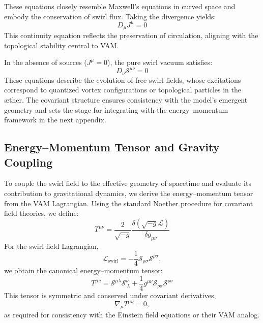         These equations closely resemble Maxwell's equations in curved space and embody the conservation of swirl flux. Taking the divergence yields:
        \begin{equation}
            D_\mu J^\mu = 0
        \end{equation}
        This continuity equation reflects the preservation of circulation, aligning with the topological stability central to VAM.

        In the absence of sources ($J^\mu = 0$), the pure swirl vacuum satisfies:
        \begin{equation}
            D_\nu \mathcal{S}^{\mu\nu} = 0
        \end{equation}
        These equations describe the evolution of free swirl fields, whose excitations correspond to quantized vortex configurations or topological particles in the æther. The covariant structure ensures consistency with the model's emergent geometry and sets the stage for integrating with the energy–momentum framework in the next appendix.

        \subsection{Energy--Momentum Tensor and Gravity Coupling}
        To couple the swirl field to the effective geometry of spacetime and evaluate its contribution to gravitational dynamics, we derive the energy--momentum tensor from the VAM Lagrangian. Using the standard Noether procedure for covariant field theories, we define:
        \begin{equation}
            T^{\mu\nu} = \frac{2}{\sqrt{-g}} \frac{\delta (\sqrt{-g} \mathcal{L})}{\delta g_{\mu\nu}}
        \end{equation}
        For the swirl field Lagrangian,
        \begin{equation}
            \mathcal{L}_{\text{swirl}} = -\frac{1}{4} \mathcal{S}_{\rho\sigma} \mathcal{S}^{\rho\sigma},
        \end{equation}
        we obtain the canonical energy--momentum tensor:
        \begin{equation}
            T^{\mu\nu} = \mathcal{S}^{\mu\lambda} \mathcal{S}^\nu_{\ \lambda} + \frac{1}{4} g^{\mu\nu} \mathcal{S}_{\rho\sigma} \mathcal{S}^{\rho\sigma}
        \end{equation}
        This tensor is symmetric and conserved under covariant derivatives,
        \begin{equation}
            \nabla_\mu T^{\mu\nu} = 0,
        \end{equation}
        as required for consistency with the Einstein field equations or their VAM analog.

